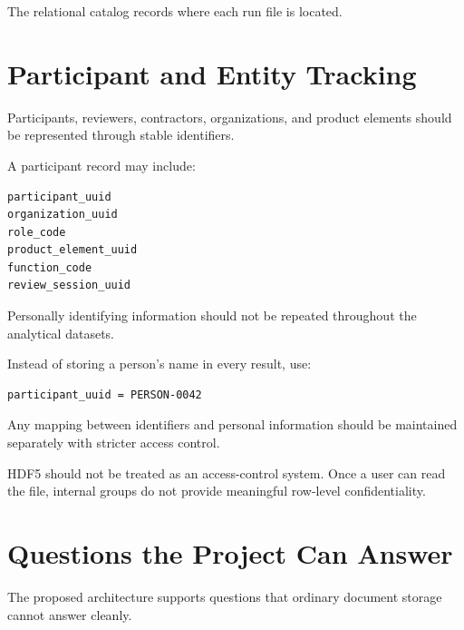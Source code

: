 \documentclass[11pt]{report}
\begin{document}
The relational catalog records where each run file is located.

\chapter{Participant and Entity Tracking}

Participants, reviewers, contractors, organizations, and product elements should be represented through stable identifiers.

A participant record may include:

\begin{verbatim}
participant_uuid
organization_uuid
role_code
product_element_uuid
function_code
review_session_uuid
\end{verbatim}

Personally identifying information should not be repeated throughout the analytical datasets.

Instead of storing a person's name in every result, use:

\begin{verbatim}
participant_uuid = PERSON-0042
\end{verbatim}

Any mapping between identifiers and personal information should be maintained separately with stricter access control.

HDF5 should not be treated as an access-control system. Once a user can read the file, internal groups do not provide meaningful row-level confidentiality.

\chapter{Questions the Project Can Answer}

The proposed architecture supports questions that ordinary document storage cannot answer cleanly.
\end{document}

